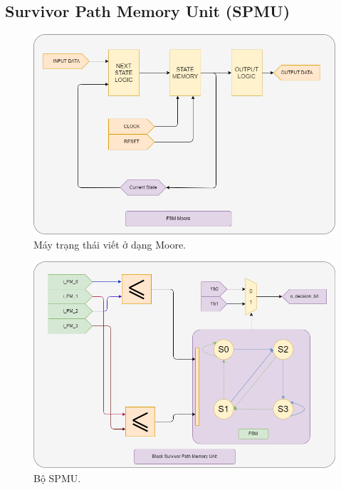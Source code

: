 \subsection{Survivor Path Memory Unit (SPMU)}

\begin{figure}[H]
	\centering
	\includegraphics[width=.8\linewidth]{sections/pic/mophongbangSystemVerilog/FSM.png}
	\caption{Máy trạng thái viết ở dạng Moore.}
\end{figure}

\begin{figure}[H]
	\centering
	\includegraphics[width=.8\linewidth]{sections/pic/mophongbangSystemVerilog/SPMU.png}
	\caption{Bộ SPMU.}
\end{figure}

